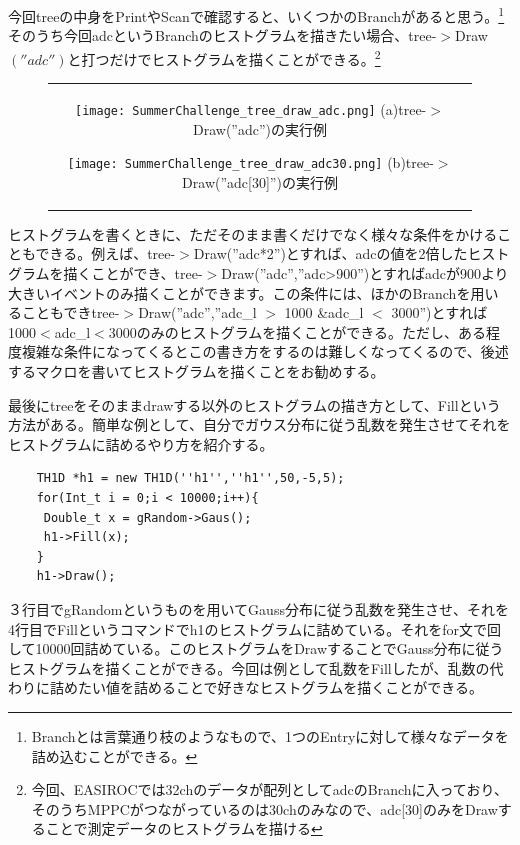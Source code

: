 今回treeの中身をPrintやScanで確認すると、いくつかのBranchがあると思う。\footnote{Branchとは言葉通り枝のようなもので、1つのEntryに対して様々なデータを詰め込むことができる。}そのうち今回adcというBranchのヒストグラムを描きたい場合、tree-$>$Draw$\left(''adc''\right)$と打つだけでヒストグラムを描くことができる。\footnote{今回、EASIROCでは32chのデータが配列としてadcのBranchに入っており、そのうちMPPCがつながっているのは30chのみなので、adc[30]のみをDrawすることで測定データのヒストグラムを描ける}
\begin{figure}[htbp]
  \begin{center}
    \begin{tabular}{c}

      \begin{minipage}{0.5\hsize}
        \begin{center}
          \texttt{[image: SummerChallenge\_tree\_draw\_adc.png]}
          \hspace{1.6cm} (a)tree-$>$Draw(''adc'')の実行例
        \end{center}
      \end{minipage}

      \begin{minipage}{0.5\hsize}
        \begin{center}
          \texttt{[image: SummerChallenge\_tree\_draw\_adc30.png]}
          \hspace{1.6cm} (b)tree-$>$Draw(''adc[30]'')の実行例
        \end{center}
      \end{minipage}
    \end{tabular}
    \label{fig:tree_draw}
  \end{center}
\end{figure}

ヒストグラムを書くときに、ただそのまま書くだけでなく様々な条件をかけることもできる。例えば、tree-$>$Draw(''adc*2'')とすれば、adcの値を2倍したヒストグラムを描くことができ、tree-$>$Draw(''adc'',''adc>900'')とすればadcが900より大きいイベントのみ描くことができます。この条件には、ほかのBranchを用いることもできtree-$>$Draw(''adc'',''adc\_l $>$ 1000 \&adc\_l $<$ 3000'')とすれば1000$<$adc\_l$<$3000のみのヒストグラムを描くことができる。ただし、ある程度複雑な条件になってくるとこの書き方をするのは難しくなってくるので、後述するマクロを書いてヒストグラムを描くことをお勧めする。

最後にtreeをそのままdrawする以外のヒストグラムの描き方として、Fillという方法がある。簡単な例として、自分でガウス分布に従う乱数を発生させてそれをヒストグラムに詰めるやり方を紹介する。
\begin{lstlisting}
    TH1D *h1 = new TH1D(''h1'',''h1'',50,-5,5);
    for(Int_t i = 0;i < 10000;i++){
     Double_t x = gRandom->Gaus();
     h1->Fill(x);
    }
    h1->Draw();
 \end{lstlisting}
３行目でgRandomというものを用いてGauss分布に従う乱数を発生させ、それを4行目でFillというコマンドでh1のヒストグラムに詰めている。それをfor文で回して10000回詰めている。このヒストグラムをDrawすることでGauss分布に従うヒストグラムを描くことができる。今回は例として乱数をFillしたが、乱数の代わりに詰めたい値を詰めることで好きなヒストグラムを描くことができる。

